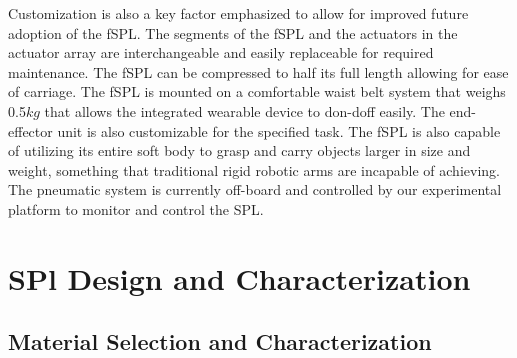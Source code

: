 \documentclass[letterpaper, 10 pt, conference]{ieeeconf}  %
\begin{document}
Customization is also a key factor emphasized to allow for improved future adoption of the fSPL. The segments of the fSPL and the actuators in the actuator array are interchangeable and easily replaceable for required maintenance. The fSPL can be compressed to half its full length allowing for ease of carriage. The fSPL is mounted on a comfortable waist belt system that weighs 0.5$kg$ that allows the integrated wearable device to don-doff easily. The end-effector unit is also customizable for the specified task. The fSPL is also capable of utilizing its entire soft body to grasp and carry objects larger in size and weight, something that traditional rigid robotic arms are incapable of achieving. The pneumatic system is currently off-board and controlled by our experimental platform \cite{nguyen2018} to monitor and control the SPL.










 
\section{SPl Design and Characterization} 

\subsection{Material Selection and Characterization}
\label{sec:mat_select}
\end{document}
